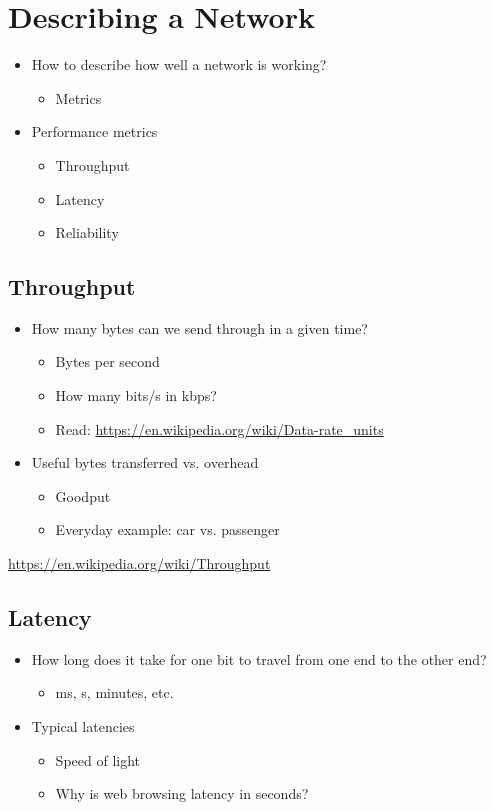 \section{Describing a Network}
\begin{itemize}[nosep]
    \item How to describe how well a network is working?
          \begin{itemize}[nosep]
              \item Metrics
          \end{itemize}
    \item Performance metrics
          \begin{itemize}[nosep]
              \item Throughput
              \item Latency
              \item Reliability
          \end{itemize}
\end{itemize}
\subsection{Throughput}
\begin{itemize}[nosep]
    \item How many bytes can we send through in a given time?
          \begin{itemize}[nosep]
              \item Bytes per second
              \item How many bits/s in kbps?
              \item Read: \url{https://en.wikipedia.org/wiki/Data-rate_units}
          \end{itemize}
    \item Useful bytes transferred vs. overhead
          \begin{itemize}[nosep]
              \item Goodput
              \item Everyday example: car vs. passenger
          \end{itemize}
\end{itemize}
\url{https://en.wikipedia.org/wiki/Throughput}
\subsection{Latency}
\begin{itemize}[nosep]
    \item How long does it take for one bit to travel from one end to the other end?
          \begin{itemize}[nosep]
              \item ms, s, minutes, etc.
          \end{itemize}
    \item Typical latencies
          \begin{itemize}[nosep]
              \item Speed of light
              \item Why is web browsing latency in seconds?
          \end{itemize}
\end{itemize}

